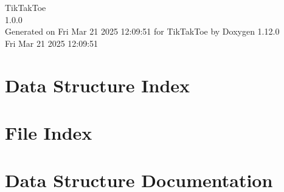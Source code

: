 \documentclass[twoside]{book}
\newcommand{\+}{\discretionary{\mbox{\scriptsize$\hookleftarrow$}}{}{}}
\newcommand{\clearemptydoublepage}{%
    \newpage{\pagestyle{empty}\cleardoublepage}%
  }
\begin{document}
  \raggedbottom
    \hypersetup{pageanchor=false,
                bookmarksnumbered=true,
                pdfencoding=unicode
               }
  \begin{titlepage}
  \vspace*{7cm}
  \begin{center}%
  {\Large Tik\+Tak\+Toe}\\
  [1ex]\large 1.\+0.\+0 \\
  \vspace*{1cm}
  {\large Generated on Fri Mar 21 2025 12\+:09\+:51 for Tik\+Tak\+Toe by Doxygen 1.12.0}\\
    \vspace*{0.5cm}
    {\small Fri Mar 21 2025 12:09:51}
  \end{center}
  \end{titlepage}
  \clearemptydoublepage
  \tableofcontents
  \clearemptydoublepage
  \hypersetup{pageanchor=true}



\chapter{Data Structure Index}

\chapter{File Index}

\chapter{Data Structure Documentation}







\end{document}
